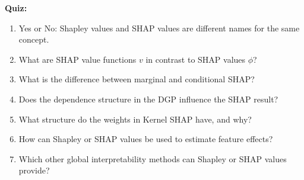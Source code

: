 \textbf{Quiz:}
\begin{enumerate}
    \item Yes or No: Shapley values and SHAP values are different names for the same concept.
    \item What are SHAP value functions $v$ in contrast to SHAP values $\phi$?
    \item What is the difference between marginal and conditional SHAP?
    \item Does the dependence structure in the DGP influence the SHAP result?
    \item What structure do the weights in Kernel SHAP have, and why?
    \item How can Shapley or SHAP values be used to estimate feature effects?
    \item Which other global interpretability methods can Shapley or SHAP values provide?
\end{enumerate}
